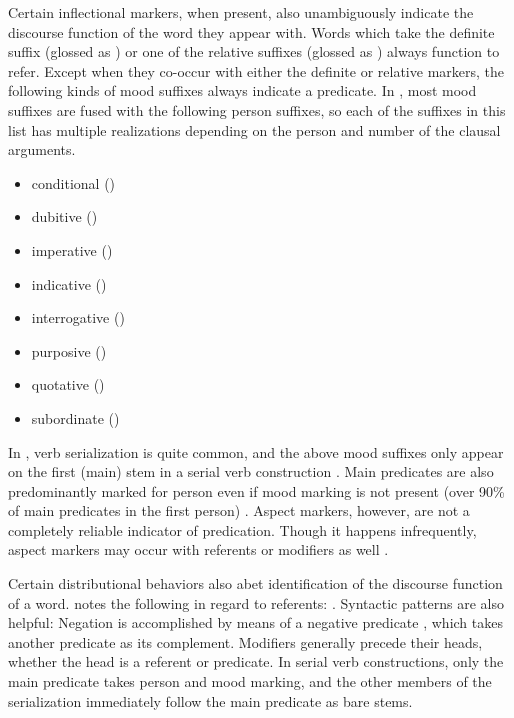 Certain inflectional markers, when present, also unambiguously indicate the discourse function of the word they appear with. Words which take the definite suffix  (glossed as ) or one of the relative suffixes (glossed as ) always function to refer. Except when they co-occur with either the definite or relative markers, the following kinds of mood suffixes always indicate a predicate. In , most mood suffixes are fused with the following person suffixes, so each of the suffixes in this list has multiple realizations depending on the person and number of the clausal arguments.

\begin{itemize}
  \singlespacing
  \item conditional ()
  \item dubitive ()
  \item imperative ()
  \item indicative ()
  \item interrogative ()
  \item purposive ()
  \item quotative ()
  \item subordinate ()
\end{itemize}

\noindent In , verb serialization is quite common, and the above mood suffixes only appear on the first (main) stem in a serial verb construction \parencite[42]{Nakayama2001}. Main predicates are also predominantly marked for person even if mood marking is not present (over 90\% of main predicates in the first person) \parencite[29]{Nakayama2001}. Aspect markers, however, are not a completely reliable indicator of predication. Though it happens infrequently, aspect markers may occur with referents or modifiers as well \parencite[47--50]{Nakayama2001}.

Certain distributional behaviors also abet identification of the discourse function of a word. \citeauthor{Nakayama2001} notes the following in regard to referents: . Syntactic patterns are also helpful: Negation is accomplished by means of a negative predicate , which takes another predicate as its complement. Modifiers generally precede their heads, whether the head is a referent or predicate. In serial verb constructions, only the main predicate takes person and mood marking, and the other members of the serialization immediately follow the main predicate as bare stems.

